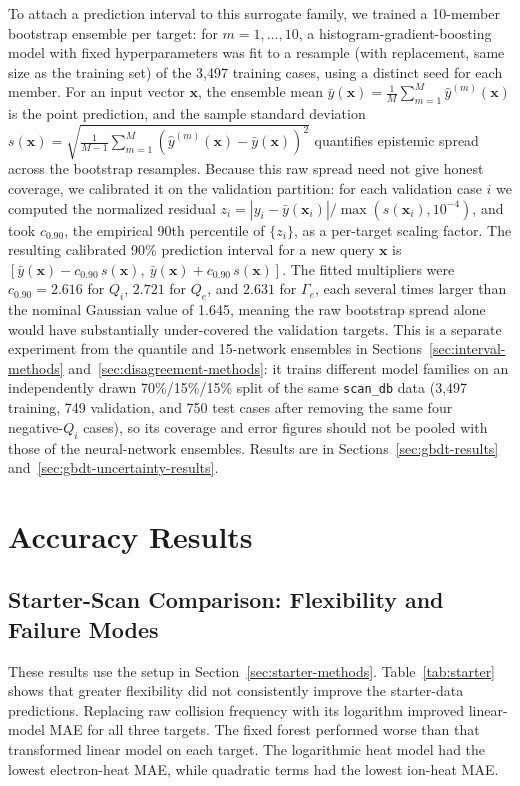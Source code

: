 \documentclass[12pt,letterpaper]{article}
\begin{document}
To attach a prediction interval to this surrogate family, we trained a
10-member bootstrap ensemble per target: for $m = 1, \dots, 10$, a
histogram-gradient-boosting model with fixed hyperparameters was fit to a
resample (with replacement, same size as the training set) of the 3,497
training cases, using a distinct seed for each member. For an input vector
$\mathbf{x}$, the ensemble mean $\bar{y}(\mathbf{x}) = \frac{1}{M}\sum_{m=1}^{M}
\hat{y}^{(m)}(\mathbf{x})$ is the point prediction, and the sample standard
deviation
$s(\mathbf{x}) = \sqrt{\frac{1}{M-1}\sum_{m=1}^{M}(\hat{y}^{(m)}(\mathbf{x}) -
  \bar{y}(\mathbf{x}))^2}$
quantifies epistemic spread across the bootstrap resamples. Because this raw
spread need not give honest coverage, we calibrated it on the validation
partition: for each validation case $i$ we computed the normalized residual
$z_i = |y_i - \bar{y}(\mathbf{x}_i)| / \max(s(\mathbf{x}_i), 10^{-4})$, and
took $c_{0.90}$, the empirical 90th percentile of $\{z_i\}$, as a per-target
scaling factor. The resulting calibrated 90\% prediction interval for a new
query $\mathbf{x}$ is $[\bar{y}(\mathbf{x}) - c_{0.90}\,s(\mathbf{x}),\
\bar{y}(\mathbf{x}) + c_{0.90}\,s(\mathbf{x})]$. The fitted multipliers were
$c_{0.90} = 2.616$ for $Q_i$, $2.721$ for $Q_e$, and $2.631$ for $\Gamma_e$,
each several times larger than the nominal Gaussian value of 1.645, meaning
the raw bootstrap spread alone would have substantially under-covered the
validation targets. This is a separate experiment from the quantile and
15-network ensembles in Sections~\ref{sec:interval-methods}
and~\ref{sec:disagreement-methods}: it trains different model families on an
independently drawn 70\%/15\%/15\% split of the same \texttt{scan\_db} data
(3,497 training, 749 validation, and 750 test cases after removing the same
four negative-$Q_i$ cases), so its coverage and error figures should not be
pooled with those of the neural-network ensembles. Results are in
Sections~\ref{sec:gbdt-results} and~\ref{sec:gbdt-uncertainty-results}.

\section{Accuracy Results}
\label{sec:accuracy-results}
\subsection{Starter-Scan Comparison: Flexibility and Failure Modes}
\label{sec:starter-results}

These results use the setup in Section~\ref{sec:starter-methods}.
Table~\ref{tab:starter} shows that greater flexibility did not consistently
improve the starter-data predictions. Replacing raw collision frequency with
its logarithm improved linear-model MAE for all three targets. The fixed
forest performed worse than that transformed linear model on each target.
The logarithmic heat model had the lowest electron-heat MAE, while quadratic
terms had the lowest ion-heat MAE.
\end{document}
